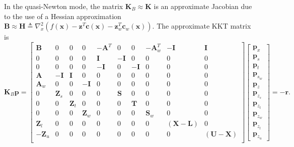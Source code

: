 \documentclass[12pt]{article}
\newcommand{\mb}{\mathbf}
\begin{document}
In the quasi-Newton mode, the matrix $\mb{K}_{B} \approx \mb{K}$ is an approximate Jacobian due to the use of a Hessian approximation $\mb{B} \approx \mb{H} \triangleq \nabla_{x}^{2} \left(f(\mb{x}) - \mb{z}^{T}\mb{c}(\mb{x}) - \mb{z}_{w}^{T}\mb{c}_{w}(\mb{x}) \right)$.
The approximate KKT matrix is
%
\begin{equation}
  \label{eqn:kkt-update}
  \mb{K}_{B}\mb{p} =
  \begin{bmatrix}
    \mb{B}     & 0          & 0          & 0          & -\mb{A}^{T} & 0       & 0       & -\mb{A}^{T}_{w} & -\mb{I} & \mb{I} \\
    0          & 0          & 0          & 0          & \mb{I}      & -\mb{I} & 0       & 0               & 0       & 0 \\
    0          & 0          & 0          & 0          & -\mb{I}     & 0       & -\mb{I} & 0               & 0       & 0 \\
    \mb{A}     & -\mb{I}    & \mb{I}     & 0          & 0           & 0       & 0       & 0               & 0       & 0 \\
    \mb{A}_{w} & 0          & 0          & -\mb{I}    & 0           & 0       & 0       & 0               & 0       & 0 \\
    0          & \mb{Z}_{s} & 0          & 0          & 0           & \mb{S}  & 0       & 0               & 0       & 0 \\
    0          & 0          & \mb{Z}_{t} & 0          & 0           & 0       & \mb{T}  & 0               & 0       & 0 \\
    0          & 0          & 0          & \mb{Z}_{w} & 0           & 0       & 0       & \mb{S}_{w}      & 0       & 0 \\
    \mb{Z}_{l} & 0          & 0          & 0          & 0           & 0       & 0       & 0               & (\mb{X} - \mb{L}) & 0 \\
    -\mb{Z}_{u}& 0          & 0          & 0          & 0           & 0       & 0       & 0               & 0 & (\mb{U} - \mb{X}) \\
  \end{bmatrix}
  \begin{bmatrix}
    \mb{p}_{x} \\
    \mb{p}_{s} \\
    \mb{p}_{t} \\
    \mb{p}_{s_{w}} \\
    \mb{p}_{z} \\
    \mb{p}_{z_{s}} \\
    \mb{p}_{z_{t}} \\
    \mb{p}_{z_{w}} \\
    \mb{p}_{z_{l}} \\
    \mb{p}_{z_{u}}
  \end{bmatrix} = -\mb{r}.
\end{equation}
\end{document}
